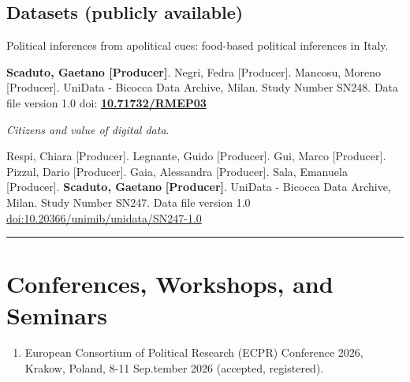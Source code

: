 \documentclass[10pt,]{article}
\providecommand{\tightlist}{%
  \setlength{\itemsep}{0pt}\setlength{\parskip}{0pt}}
\renewenvironment{itemize}{
  \begin{list}{}{
    \setlength{\leftmargin}{1.5em}
  }
}{
  \end{list}
}
\begin{document}
\subsection{Datasets (publicly
available)}\label{datasets-publicly-available}

\begin{enumerate}
\def\labelenumi{\arabic{enumi}.}
\setcounter{enumi}{1}
\tightlist
\item
  Political inferences from apolitical cues: food-based political
  inferences in Italy.

  \begin{itemize}
  \tightlist
  \item
    \textbf{Scaduto, Gaetano {[}Producer{]}}. Negri, Fedra
    {[}Producer{]}. Mancosu, Moreno {[}Producer{]}. UniData - Bicocca
    Data Archive, Milan. Study Number SN248. Data file version 1.0 doi:
    \href{https://doi.org/10.71732/RMEP03}{\textbf{10.71732/RMEP03}}
  \end{itemize}
\end{enumerate}

\begin{enumerate}
\def\labelenumi{\arabic{enumi}.}
\tightlist
\item
  \emph{Citizens and value of digital data}.

  \begin{itemize}
  \tightlist
  \item
    Respi, Chiara {[}Producer{]}. Legnante, Guido {[}Producer{]}. Gui,
    Marco {[}Producer{]}. Pizzul, Dario {[}Producer{]}. Gaia, Alessandra
    {[}Producer{]}. Sala, Emanuela {[}Producer{]}. \textbf{Scaduto,
    Gaetano} \textbf{{[}Producer{]}}. UniData - Bicocca Data Archive,
    Milan. Study Number SN247. Data file version 1.0
    \href{http://dx.doi.org/10.20366/unimib/unidata/SN247-1.0}{doi:10.20366/unimib/unidata/SN247-1.0}
  \end{itemize}
\end{enumerate}

\bigskip \hrule

\section{Conferences, Workshops, and
Seminars}\label{conferences-workshops-and-seminars}

\begin{enumerate}
\def\labelenumi{\arabic{enumi}.}
\setcounter{enumi}{24}
\tightlist
\item
  European Consortium of Political Research (ECPR) Conference 2026,
  Krakow, Poland, 8-11 Sep.tember 2026 (accepted, registered).
\end{enumerate}
\end{document}
